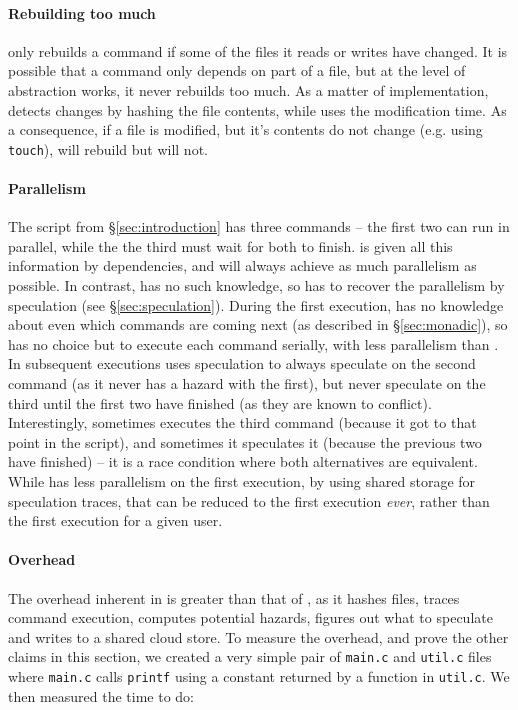 \paragraph{Rebuilding too much} \Rattle only rebuilds a command if some of the files it reads or writes have changed. It is possible that a command only depends on part of a file, but at the level of abstraction \Rattle works, it never rebuilds too much. As a matter of implementation, \Rattle detects changes by hashing the file contents, while \Make uses the modification time. As a consequence, if a file is modified, but it's contents do not change (e.g. using \texttt{touch}), \Make will rebuild but \Rattle will not.

\paragraph{Parallelism} The script from \S\ref{sec:introduction} has three commands -- the first two can run in parallel, while the the third must wait for both to finish. \Make is given all this information by dependencies, and will always achieve as much parallelism as possible. In contrast, \Rattle has no such knowledge, so has to recover the parallelism by speculation (see \S\ref{sec:speculation}). During the first execution, \Rattle has no knowledge about even which commands are coming next (as described in \S\ref{sec:monadic}), so has no choice but to execute each command serially, with less parallelism than \Make. In subsequent executions \Rattle uses speculation to always speculate on the second command (as it never has a hazard with the first), but never speculate on the third until the first two have finished (as they are known to conflict). Interestingly, sometimes \Rattle executes the third command (because it got to that point in the script), and sometimes it speculates it (because the previous two have finished) -- it is a race condition where both alternatives are equivalent. While \Rattle has less parallelism on the first execution, by using shared storage for speculation traces, that can be reduced to the first execution \emph{ever}, rather than the first execution for a given user.

\paragraph{Overhead} The overhead inherent in \Rattle is greater than that of \Make, as it hashes files, traces command execution, computes potential hazards, figures out what to speculate and writes to a shared cloud store. To measure the overhead, and prove the other claims in this section, we created a very simple pair of \texttt{main.c} and \texttt{util.c} files where \texttt{main.c} calls \texttt{printf} using a constant returned by a function in \texttt{util.c}. We then measured the time to do:

